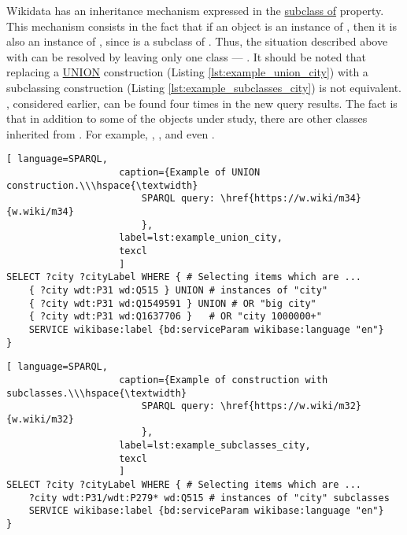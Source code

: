 Wikidata has an inheritance mechanism expressed in the  \href{https://www.wikidata.org/wiki/Property:P279}{subclass of} property. This mechanism consists in the fact that if an object is an instance of , then it is also an instance of , since  is a subclass of . Thus, the situation described above with  can be resolved by leaving only one class — . It should be noted that replacing a \href{https://en.wikibooks.org/wiki/SPARQL/UNION}{UNION} construction (Listing  \ref{lst:example_union_city}) with a subclassing construction (Listing \ref{lst:example_subclasses_city}) is not equivalent. , considered earlier, can be found four times in the new query results. The fact is that in addition to some of the objects under study, there are other classes inherited from . For example, , ,  and even .


\begin{lstlisting}[ language=SPARQL, 
                    caption={Example of UNION construction.\\\hspace{\textwidth}
                        SPARQL query: \href{https://w.wiki/m34}{w.wiki/m34}
                        },
                    label=lst:example_union_city,
                    texcl 
                    ]
SELECT ?city ?cityLabel WHERE { # Selecting items which are ...
	{ ?city wdt:P31 wd:Q515 } UNION # instances of "city"            
	{ ?city wdt:P31 wd:Q1549591 } UNION # OR "big city"               
	{ ?city wdt:P31 wd:Q1637706 } 	# OR "city 1000000+"
	SERVICE wikibase:label {bd:serviceParam wikibase:language "en"}
}
\end{lstlisting}%


\begin{lstlisting}[ language=SPARQL, 
                    caption={Example of construction with subclasses.\\\hspace{\textwidth}
                        SPARQL query: \href{https://w.wiki/m32}{w.wiki/m32}
                        },
                    label=lst:example_subclasses_city,
                    texcl 
                    ]
SELECT ?city ?cityLabel WHERE { # Selecting items which are ...
	?city wdt:P31/wdt:P279* wd:Q515 # instances of "city" subclasses
	SERVICE wikibase:label {bd:serviceParam wikibase:language "en"}
}
\end{lstlisting}%

